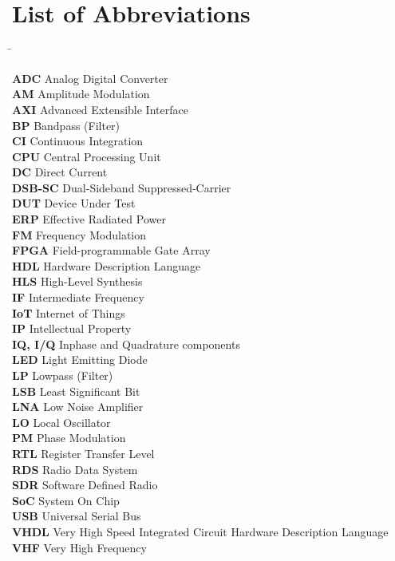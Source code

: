 \chapter{List of Abbreviations}
\label{cha:listabbrev}

\begin{tabbing}
\hspace{25 mm}\=\kill

\textbf{ADC}       \> Analog Digital Converter\\
\textbf{AM}        \> Amplitude Modulation\\
\textbf{AXI}       \> Advanced Extensible Interface\\
\textbf{BP}        \> Bandpass (Filter)\\
\textbf{CI}        \> Continuous Integration\\
\textbf{CPU}       \> Central Processing Unit\\
\textbf{DC}        \> Direct Current\\
\textbf{DSB-SC}    \> Dual-Sideband Suppressed-Carrier\\
\textbf{DUT}       \> Device Under Test\\
\textbf{ERP}       \> Effective Radiated Power\\
\textbf{FM}        \> Frequency Modulation\\
\textbf{FPGA}      \> Field-programmable Gate Array\\
\textbf{HDL}       \> Hardware Description Language\\
\textbf{HLS}       \> High-Level Synthesis\\
\textbf{IF}        \> Intermediate Frequency\\
\textbf{IoT}       \> Internet of Things\\
\textbf{IP}        \> Intellectual Property\\
\textbf{IQ, I/Q}   \> Inphase and Quadrature components\\
\textbf{LED}       \> Light Emitting Diode\\
\textbf{LP}        \> Lowpass (Filter)\\
\textbf{LSB}       \> Least Significant Bit\\
\textbf{LNA}       \> Low Noise Amplifier\\
\textbf{LO}        \> Local Oscillator\\
\textbf{PM}        \> Phase Modulation\\
\textbf{RTL}       \> Register Transfer Level\\
\textbf{RDS}       \> Radio Data System\\
\textbf{SDR}       \> Software Defined Radio\\
\textbf{SoC}       \> System On Chip\\
\textbf{USB}       \> Universal Serial Bus\\
\textbf{VHDL}      \> Very High Speed Integrated Circuit Hardware Description Language\\
\textbf{VHF}       \> Very High Frequency\\

\end{tabbing}
